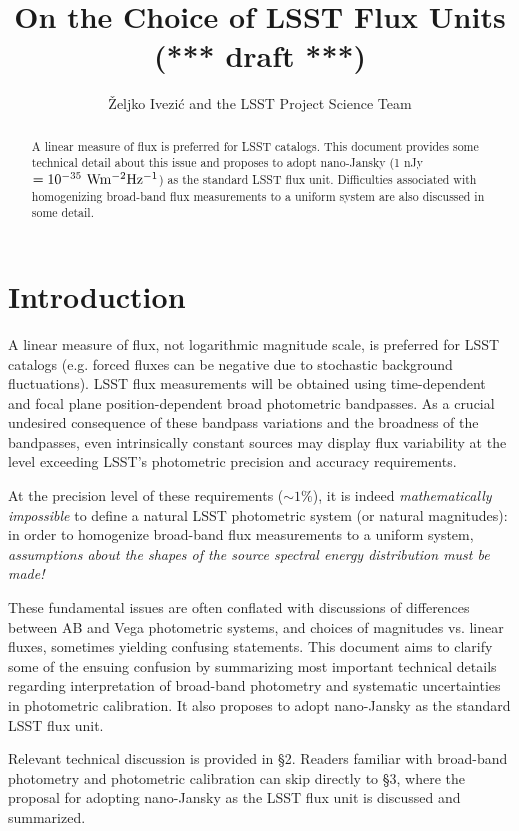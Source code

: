 \documentclass{emulateapj}
\begin{document}
\title{On the Choice of LSST Flux Units (*** draft ***)} 
\author{\v{Z}eljko Ivezi\'{c} and the LSST Project Science Team} 


\begin{abstract}
A linear measure of flux is preferred for LSST catalogs. This document
provides some technical detail about this issue and proposes to adopt
nano-Jansky (1 nJy $=10^{-35} \,\, {\rm W m^{-2} Hz^{-1}}$) as the standard 
LSST flux unit. Difficulties associated with homogenizing broad-band
flux measurements to a uniform system are also discussed in some detail. 
\end{abstract}



\section{Introduction} 

A linear measure of flux, not logarithmic magnitude scale, is preferred
for LSST catalogs (e.g. forced fluxes can be negative due to stochastic
background fluctuations). LSST flux measurements will be obtained using
time-dependent and focal plane position-dependent broad photometric 
bandpasses. As a crucial undesired consequence of these bandpass variations
and the broadness of the bandpasses, even intrinsically constant sources may 
display flux variability at the level exceeding LSST's photometric precision 
and accuracy requirements. 

At the precision level of these requirements ($\sim1\%$), it is indeed {\it 
mathematically impossible} to define a natural LSST photometric system (or 
natural magnitudes): in order to homogenize broad-band flux measurements 
to a uniform system, {\it assumptions about the shapes of the source spectral 
energy distribution must be made!}

These fundamental issues are often conflated with discussions of differences 
between AB and Vega photometric systems, and choices of magnitudes vs. linear
fluxes, sometimes yielding confusing statements.  This document aims to clarify
some of the ensuing confusion by summarizing most important technical details
regarding interpretation of broad-band photometry and systematic uncertainties in 
photometric calibration. It also proposes to adopt nano-Jansky as the standard 
LSST flux unit. 

Relevant technical discussion is provided in \S 2. Readers familiar 
with broad-band photometry and photometric calibration can skip
directly to \S 3, where the proposal for adopting nano-Jansky 
as the LSST flux unit is discussed and summarized. 
\end{document}
